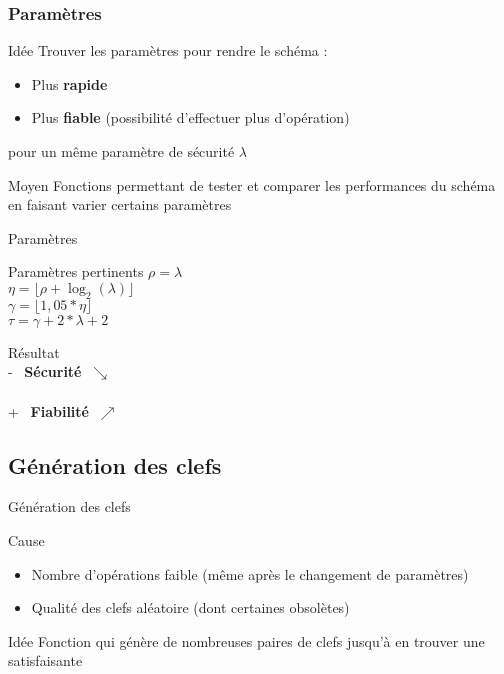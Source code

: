 \begin{frame}
\frametitle{Paramètres}
\begin{alertblock}{Idée}
    Trouver les paramètres pour rendre le schéma :
    \begin{itemize}
        \item Plus \textbf{rapide}
        \item Plus \textbf{fiable} (possibilité d'effectuer plus d'opération)
        
    \end{itemize}{}
    pour un même paramètre de sécurité $\lambda$
\end{alertblock}{}
\begin{alertblock}{Moyen}
    Fonctions permettant de tester et comparer les performances du schéma en faisant varier certains paramètres
\end{alertblock}{}
\end{frame}


\begin{frame}{Paramètres}

\begin{alertblock}{Paramètres pertinents}
	    $\rho = \lambda$ \\
	    $\eta = \lfloor \rho + \operatorname{log}_2  (\lambda) \rfloor $ \\
	    $\gamma = \lfloor 1,05* \eta \rfloor $ \\
	    $\tau = \gamma + 2*\lambda + 2$
\end{alertblock}{}

 \begin{alertblock}{Résultat}
     \ \\ - \ \textbf{Sécurité} $\ \searrow $ \\ \\
     + \ \textbf{Fiabilité} $\ \nearrow$ \\
 \end{alertblock}{}   
\end{frame}

\subsection{Génération des clefs}

\begin{frame}{Génération des clefs}
 \begin{alertblock}{Cause}
     \begin{itemize}
         \item Nombre d'opérations faible (même après le changement de paramètres)
         \item Qualité des clefs aléatoire (dont certaines obsolètes)
     \end{itemize}{}
 \end{alertblock}{}  
 \begin{alertblock}{Idée}
     Fonction qui génère de nombreuses paires de clefs jusqu'à en trouver une satisfaisante
 \end{alertblock}{}
\end{frame}

